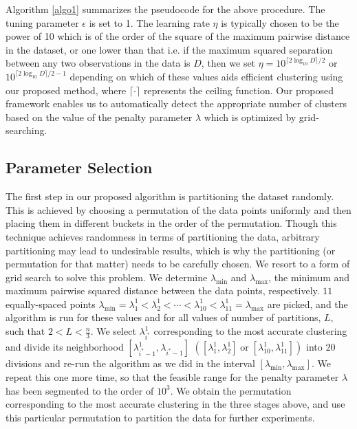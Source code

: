 \documentclass[11pt]{article}
\begin{document}

Algorithm \ref{algo1} summarizes the pseudocode for the above procedure. The tuning parameter $\epsilon$ is set to 1. The learning rate $\eta$ is typically chosen to be the power of 10 which is of the order of the square of the maximum pairwise distance in the dataset, or one lower than that i.e. if the maximum squared separation between any two observations in the data is $D$, then we set $\eta = 10 ^{\lceil 2\log_{10} D \rceil /2}$ or $10^{\lceil 2\log_{10} D \rceil /2-1}$ depending on which of these values aids efficient clustering using our proposed method, where $\lceil \cdot \rceil$ represents the ceiling function. Our proposed framework enables us to automatically detect the appropriate number of clusters based on the value of the penalty parameter $\lambda$ which is optimized by grid-searching.

\subsection{Parameter Selection}
The first step in our proposed algorithm is partitioning the dataset randomly. This is achieved by choosing a permutation of the data points uniformly and then placing them in different buckets in the order of the permutation. Though this technique achieves randomness in terms of partitioning the data, arbitrary partitioning may lead to undesirable results, which is why the partitioning (or permutation for that matter) needs to be carefully chosen. We resort to a form of grid search to solve this problem. We determine $\lambda_{\min}$ and $\lambda_{\max}$, the minimum and maximum pairwise squared distance between the data points, respectively. $11$ equally-spaced points $\lambda_{\min} =\lambda^1_1<\lambda^1_2< \cdots < \lambda^1_{10}<\lambda^1_{11}=\lambda_{\max}$ are picked, and the algorithm is run for these values and for all values of number of partitions, $L$, such that $2<L<\frac{n}{3}$. We select $\lambda^1_{i^*}$ corresponding to the most accurate clustering and divide its neighborhood $[\lambda^1_{i^*-1},\lambda_{i^*-1}]$  $\left([\lambda^1_1,\lambda^1_2]\operatorname{ or }[\lambda^1_{10}, \lambda^1_{11}]\right)$ into $20$ divisions and re-run the algorithm as we did in the interval $[\lambda_{\min}, \lambda_{\max}]$. We repeat this one more time, so that the feasible range for the penalty parameter $\lambda$ has been segmented to the order of $10^3$. We obtain the permutation corresponding to the most accurate clustering in the three stages above, and use this particular permutation to partition the data for further experiments.
\end{document}
